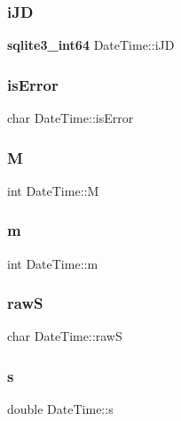 \mbox{\label{struct_date_time_ae5043d34fa3c3c4dc1121fec886c6f10}} 
\subsubsection{iJD}
{\footnotesize\ttfamily \textbf{ sqlite3\+\_\+int64} Date\+Time\+::i\+JD}

\mbox{\label{struct_date_time_ae832be3745b698b81b736029e188853b}} 
\subsubsection{isError}
{\footnotesize\ttfamily char Date\+Time\+::is\+Error}

\mbox{\label{struct_date_time_a00e6515603bb5d7c5ce79d3a5a6438a7}} 
\subsubsection{M}
{\footnotesize\ttfamily int Date\+Time\+::M}

\mbox{\label{struct_date_time_ac5db527c48331a515bea3b828d1a2254}} 
\subsubsection{m}
{\footnotesize\ttfamily int Date\+Time\+::m}

\mbox{\label{struct_date_time_a16edfd51f7db44033955b106a09759ee}} 
\subsubsection{rawS}
{\footnotesize\ttfamily char Date\+Time\+::rawS}

\mbox{\label{struct_date_time_a69a803afb69b74206418bda0bc1bcaa2}} 
\subsubsection{s}
{\footnotesize\ttfamily double Date\+Time\+::s}

\mbox{\label{struct_date_time_a7f5c2e587ee18014982d85eb616f09b8}} 
